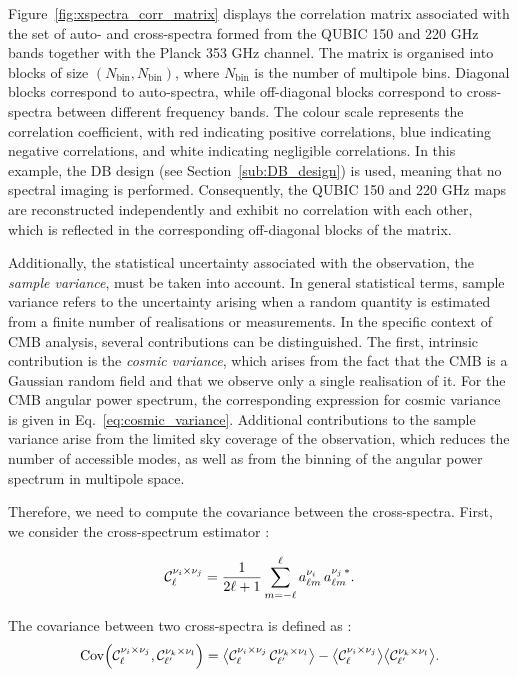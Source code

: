 \documentclass[../../thesis.tex]{subfiles}
\begin{document}
Figure~\ref{fig:xspectra_corr_matrix} displays the correlation matrix associated with the set of auto- and cross-spectra formed from the QUBIC 150 and 220 GHz bands together with the Planck 353 GHz channel. The matrix is organised into blocks of size $(N_{\mathrm{bin}}, N_{\mathrm{bin}})$, where $N_{\mathrm{bin}}$ is the number of multipole bins. Diagonal blocks correspond to auto-spectra, while off-diagonal blocks correspond to cross-spectra between different frequency bands. The colour scale represents the correlation coefficient, with red indicating positive correlations, blue indicating negative correlations, and white indicating negligible correlations. In this example, the DB design (see Section~\ref{sub:DB_design}) is used, meaning that no spectral imaging is performed. Consequently, the QUBIC 150 and 220 GHz maps are reconstructed independently and exhibit no correlation with each other, which is reflected in the corresponding off-diagonal blocks of the matrix.

Additionally, the statistical uncertainty associated with the observation, the \emph{sample variance}, must be taken into account. In general statistical terms, sample variance refers to the uncertainty arising when a random quantity is estimated from a finite number of realisations or measurements.
In the specific context of CMB analysis, several contributions can be distinguished. The first, intrinsic contribution is the \emph{cosmic variance}, which arises from the fact that the CMB is a Gaussian random field and that we observe only a single realisation of it. For the CMB angular power spectrum, the corresponding expression for cosmic variance is given in Eq.~\ref{eq:cosmic_variance}. Additional contributions to the sample variance arise from the limited sky coverage of the observation, which reduces the number of accessible modes, as well as from the binning of the angular power spectrum in multipole space.

Therefore, we need to compute the covariance between the cross-spectra. First, we consider the cross-spectrum estimator :

\begin{equation}
    \mathcal{C}_{\ell}^{\nu_{i} \times \nu_{j}} = \frac{1}{2\ell+1} \sum_{m=-\ell}^{\ell} a^{\nu_i}_{\ell m}\, a^{\nu_j\,*}_{\ell m}.
\end{equation}

The covariance between two cross-spectra is defined as :
\begin{equation}
    \mathrm{Cov}\!\left(\mathcal{C}_{\ell}^{\nu_{i} \times \nu_{j}}, \mathcal{C}_{\ell'}^{\nu_{k} \times \nu_{l}}\right) = \bigl\langle \mathcal{C}_{\ell}^{\nu_{i} \times \nu_{j}}\,\mathcal{C}_{\ell'}^{\nu_{k} \times \nu_{l}} \bigr\rangle - \bigl\langle \mathcal{C}_{\ell}^{\nu_{i} \times \nu_{j}} \bigr\rangle \bigl\langle \mathcal{C}_{\ell'}^{\nu_{k} \times \nu_{l}} \bigr\rangle.
\end{equation}
\end{document}
